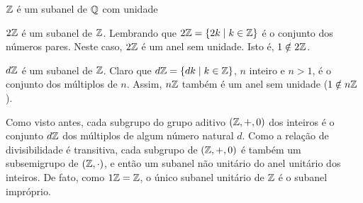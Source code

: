       \begin{exmp}
         $\mathbb{Z}$ é um subanel de $\mathbb{Q}$ com unidade
      \end{exmp}
      \begin{exmp}
         $2\mathbb{Z}$ é um subanel de $\mathbb{Z}$. Lembrando que $2\mathbb{Z} = \{2k \mid k \in \mathbb{Z}\}$ é o conjunto dos números pares. Neste caso, $2\mathbb{Z}$ é um anel sem unidade. Isto é, $1 \notin 2\mathbb{Z}$.
      \end{exmp}
      \begin{exmp}
         $d\mathbb{Z}$ é um subanel de $\mathbb{Z}$. Claro que $d\mathbb{Z} = \{dk \mid k \in \mathbb{Z}\}$, $n$ inteiro e $n>1$, é o conjunto dos múltiplos de $n$. Assim, $n\mathbb{Z}$ também é um anel sem unidade ($1 \notin n\mathbb{Z}$).
      \end{exmp}
      \begin{exmp}
         Como visto antes, cada subgrupo do grupo aditivo $(\mathbb{Z}, +, 0)$ dos inteiros é o conjunto $d\mathbb{Z}$ dos múltiplos de algum número natural $d$. Como a relação de divisibilidade é transitiva, cada subgrupo de $(\mathbb{Z}, +, 0)$ é também um subsemigrupo de $(\mathbb{Z}, \cdot)$, e então um subanel não unitário do anel unitário dos inteiros. De fato, como $1\mathbb{Z} = \mathbb{Z}$, o único subanel unitário de $\mathbb{Z}$ é o subanel impróprio.
      \end{exmp}
